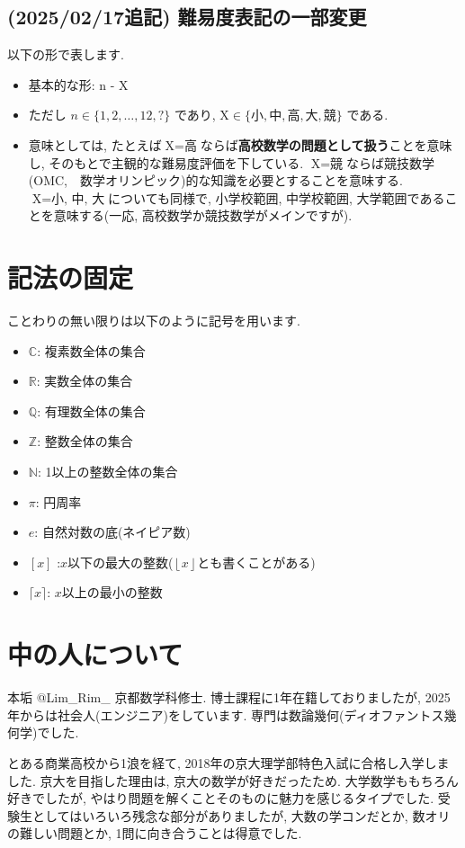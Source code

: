 \documentclass[twocolumn]{jsreport}
\begin{document}
\subsection{(2025/02/17追記) 難易度表記の一部変更}
以下の形で表します.
\begin{itemize}
\item 基本的な形: \hosi n - X
\item ただし $n\in \{ 1,2,\dots, 12, ?\}$ であり, $\text{X} \in \{ 小, 中, 高, 大, 競\}$ である.
\item 意味としては, たとえば$\text{X} = \text{高}$ならば\textbf{高校数学の問題として扱う}ことを意味し, そのもとで主観的な難易度評価を下している. $\text{X} = \text{競}$ならば競技数学(OMC,　数学オリンピック)的な知識を必要とすることを意味する. $\text{X} = \text{小, 中, 大}$についても同様で, 小学校範囲, 中学校範囲, 大学範囲であることを意味する(一応, 高校数学か競技数学がメインですが).
\end{itemize}

\section{記法の固定}
ことわりの無い限りは以下のように記号を用います.
\begin{itemize}
\item $\mathbb{C}$: 複素数全体の集合
\item $\mathbb{R}$: 実数全体の集合
\item $\mathbb{Q}$: 有理数全体の集合
\item $\mathbb{Z}$: 整数全体の集合
\item $\mathbb{N}$: 1以上の整数全体の集合
\item $\pi$: 円周率
\item $e$: 自然対数の底(ネイピア数)
\item $[x]$ :$x$以下の最大の整数($\left\lfloor x \right\rfloor$とも書くことがある)
\item $\lceil x \rceil$: $x$以上の最小の整数
\end{itemize}

\section{中の人について}
本垢 @Lim\_Rim\_  京都数学科修士. 博士課程に1年在籍しておりましたが, 2025年からは社会人(エンジニア)をしています. 専門は数論幾何(ディオファントス幾何学)でした. \par
とある商業高校から1浪を経て, 2018年の京大理学部特色入試に合格し入学しました.
京大を目指した理由は, 京大の数学が好きだったため. 大学数学ももちろん好きでしたが,
やはり問題を解くことそのものに魅力を感じるタイプでした.
受験生としてはいろいろ残念な部分がありましたが, 大数の学コンだとか,
数オリの難しい問題とか, 1問に向き合うことは得意でした.
\end{document}
